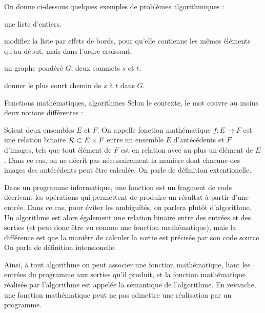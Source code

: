 \documentclass[a4paper,french,bookmarks]{book}
\begin{document}
    On donne ci-dessous quelques exemples de problèmes algorithmiques :
    \begin{example}{}{}
        \begin{enumerate}
            \itt{} une liste d'entiers.
            
                 modifier la liste par effets de bords, pour qu'elle
                contienne les mêmes éléments qu'au début, mais dans l'ordre croissant.
                
            \itt{} un graphe pondéré $G$, deux sommets $s$ et $t$.
            
                 donner le plus court chemin de $s$ à $t$ dans $G$.
        \end{enumerate}
    \end{example}
    
    \begin{definition}{Fonctions mathématiques, algorithmes}{}
        Selon le contexte, le mot  couvre au moins deux notions différentes :
        \begin{enumerate}
            \itt Soient deux ensembles $E$ et $F$. On appelle fonction mathématique $f: E \to F$  est une relation binaire $\mathcal{R} \subset E\times F$ entre un ensemble $E$ d'antécédents et $F$ d'images, tels que tout élément de $F$ est en relation avec au plus un élément de $E$. Dans ce cas, on ne décrit pas nécessairement la manière dont chacune des images des antécédents peut être calculée. On parle de définition extentionelle.
            
            \itt Dans un programme informatique, une fonction est un fragment de code décrivant les opérations qui permettent de produire un résultat à partir d'une entrée. Dans ce cas, pour éviter les ambiguïtés, on parlera plutôt d'algorithme. Un algorithme est alors également une relation binaire entre des entrées et des sorties (et peut donc être vu comme une fonction mathématique), mais la différence est que la manière de calculer la sortie est précisée par son code source. On parle de définition intensionelle.
        \end{enumerate}
    \end{definition}
    
    Ainsi, à tout algorithme on peut associer une fonction mathématique, liant les entrées du programme aux sorties qu'il produit, et la fonction mathématique réalisée par l'algorithme est appelée la sémantique de l'algorithme. En revanche, une fonction mathématique peut ne pas admettre une réalisation par un programme.
    
\end{document}
